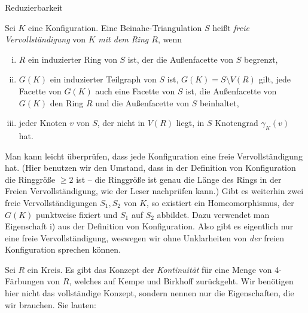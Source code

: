 \begin{section}{Reduzierbarkeit}
 \begin{definition}
  Sei $K$ eine Konfiguration. Eine Beinahe-Triangulation $S$ heißt \textit{freie Vervollständigung} von $K$ \textit{mit dem Ring $R$}, wenn
  \begin{enumerate}[i)]
   \item $R$ ein induzierter Ring von $S$ ist, der die Außenfacette von $S$ begrenzt,
   \item $G(K)$ ein induzierter Teilgraph von $S$ ist, $G(K) = S \setminus V(R)$ gilt, jede Facette von $G(K)$ auch eine Facette von $S$ ist, die Außenfacette von $G(K)$ den Ring $R$ und die Außenfacette von $S$ beinhaltet,
   \item jeder Knoten $v$ von $S$, der nicht in $V(R)$ liegt, in $S$ Knotengrad $\gamma_K(v)$ hat.
  \end{enumerate}
 \end{definition}
 
 Man kann leicht überprüfen, dass jede Konfiguration eine freie Vervollständigung hat. (Hier benutzen wir den Umstand, dass in der Definition von Konfiguration die Ringgröße $\geq 2$ ist -- die Ringgröße ist genau die Länge des Rings in der Freien Vervollständigung, wie der Leser nachprüfen kann.) Gibt es weiterhin zwei freie Vervollständigungen $S_1, S_2$ von $K$, so existiert ein Homeomorphismus, der $G(K)$ punktweise fixiert und $S_1$ auf $S_2$ abbildet. Dazu verwendet man Eigenschaft i) aus der Definition von Konfiguration. Also gibt es eigentlich nur eine freie Vervollständigung, weswegen wir ohne Unklarheiten von \textit{der} freien Konfiguration sprechen können.
 
 Sei $R$ ein Kreis. Es gibt das Konzept der \textit{Kontinuität} für eine Menge von 4-Färbungen von $R$, welches auf Kempe \cite{AmJMath79} und Birkhoff \cite{AmJMath35} zurückgeht. Wir benötigen hier nicht das vollständige Konzept, sondern nennen nur die Eigenschaften, die wir brauchen. Sie lauten:

\end{section}
